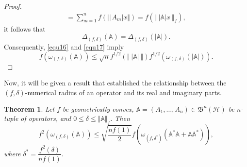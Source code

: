 \documentclass[12pt]{article}
\newtheorem{theorem}{Theorem}
\begin{document}
\begin{proof}
\begin{multline*}
 = \sum\limits_{m=1}^{n}f\left( \Vert \vert A_{m} \vert x  \Vert\right) = f\left( \Vert \ \vert \mathbb{A} \vert x \ \Vert_{f} \right) ,
\end{multline*}
it follows that
\begin{equation}
\label{equ17}
\Delta_{(f,\delta)}(\mathbb{A}) = \Delta_{(f,\delta)}( \vert \mathbb{A} \vert).
\end{equation}
Consequently, \eqref{equ16} and \eqref{equ17} imply
\[
f\left( \omega_{(f,\delta )}(\mathbb{A}  ) \right) \leq \sqrt{n}f^{1/2}\left( \Vert \ \vert \mathbb{A}\vert \ \Vert \right) f^{1/2}\left( \omega_{(f,\delta)}(\vert \mathbb{A} \vert) \right).
\tag*{\qedhere}\]
\end{proof}

Now, it will be given a result that established the relationship between the $(f,\delta)$-numerical radius of an operator and its real and imaginary parts.
\begin{theorem}
\label{thm7}
Let $ f $ be geometrically convex, $\mathbb{A}= (A_1, \ldots, A_n) \in \mathfrak{B}^{n}(\mathcal{H})$ be $n$-tuple of operators, and $0\leq \delta \leq \Vert \mathbb{A}\Vert_f$. Then
\[
f^{2}\left( \omega_{(f,\delta )}(\mathbb{A}  ) \right) \leq \sqrt{\dfrac{nf(1)}{2}}f\left(  \omega_{(f,\delta^{*})}\left( \mathbb{A}^{*}\mathbb{A}+\mathbb{A}\mathbb{A}^{*} \right) \right) ,
\]
where $ \delta^{*}=\dfrac{f^{2}(\delta)}{nf(1)}. $
\end{theorem}
\end{document}
